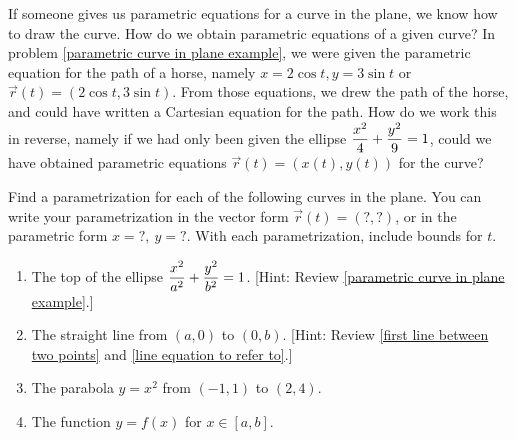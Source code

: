 If someone gives us parametric equations for a curve in the plane, we know how to draw the curve.  How do we obtain parametric equations of a given curve? In problem \ref{parametric curve in plane example}, we were given the parametric equation for the path of a horse, namely $x=2\cos t, y=3 \sin t$ or $\vec r(t)=(2\cos t,3\sin t)$. From those equations, we drew the path of the horse, and could have written a Cartesian equation for the path. How do we work this in reverse, namely if we had only been given the ellipse $\displaystyle\frac{x^2}{4}+\frac{y^2}{9}=1$, could we have obtained parametric equations $\vec r(t)=(x(t),y(t))$ for the curve?
\begin{problem}\label{parameterizing plane curves}
%
 Find a parametrization for each of the following curves in the plane. 
 You can write your parametrization in the vector form $\vec r(t)=(?,?)$, or in the parametric form $x=?,\ y=?$. 
 With each parametrization, include bounds for $t$.
\begin{enumerate}
 \item The top of the ellipse $\displaystyle\frac{x^2}{a^2}+\frac{y^2}{b^2}=1$. [Hint: Review \ref{parametric curve in plane example}.]
 \item The straight line from $(a,0)$ to $(0,b)$. [Hint: Review \ref{first line between two points} and \ref{line equation to refer to}.]
 \item The parabola $y=x^2$ from $(-1,1)$ to $(2,4)$.
 \item The function $y=f(x)$ for $x\in[a,b]$.
\end{enumerate}
\end{problem}

